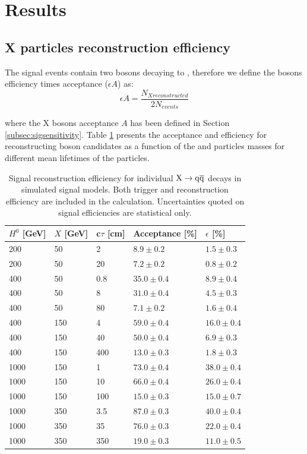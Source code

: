 \section{Results}
\label{sec:results}

\subsection{X particles reconstruction efficiency}
\label{subsec:signalefficiency}

The signal events contain two \X bosons decaying to \qq, therefore we define the \X bosons 
 efficiency times acceptance ($\epsilon A$) as:
\begin{equation}
\epsilon A= \frac{N_{X reconstructed}}{2N_{events}}
\end{equation}

where the X bosons acceptance $A$ has been defined in Section \ref{subsec:sigsensitivity}. 
Table \ref{tab:sigeff} presents the acceptance and efficiency for
reconstructing \X boson candidates as a function of the \Higgs and \X particles masses for different 
mean lifetimes of the \X particles.

\begin{table}[htbp]
\caption{Signal reconstruction efficiency for individual $\mathrm{X}\rightarrow\mathrm{q}\overline{\mathrm{q}}$ decays in simulated signal models. 
Both trigger and reconstruction efficiency 
are included in the calculation. Uncertainties quoted on signal efficiencies are statistical only.\label{tab:sigeff}}
\centering
\begin{tabular}{lllll} 
\hline
$H^{0}$ [GeV] & $X$ [GeV] & c$\tau$ [cm] & Acceptance [\%] & $\epsilon$ [\%] \\
\hline
200 & 50 & 2 & $8.9\pm0.2$ & $1.5\pm0.3$ \\
200 & 50 & 20 & $7.2\pm0.2$ & $0.8\pm0.2$ \\
\hline
400 & 50 & 0.8 & $35.0\pm0.4$ & $8.9\pm0.4$ \\
400 & 50 & 8 & $31.0\pm0.4$ & $4.5\pm0.3$ \\
400 & 50 & 80 & $7.1\pm0.2$ & $1.6\pm0.4$ \\
\hline
400 & 150 & 4 & $59.0\pm0.4$ & $16.0\pm0.4$ \\
400 & 150 & 40 & $50.0\pm0.4$ & $6.9\pm0.3$ \\
400 & 150 & 400 & $13.0\pm0.3$ & $1.8\pm0.3$ \\
\hline
1000 & 150 & 1 & $73.0\pm0.4$ & $38.0\pm0.4$ \\
1000 & 150 & 10 & $66.0\pm0.4$ & $26.0\pm0.4$ \\
1000 & 150 & 100 & $15.0\pm0.3$ & $15.0\pm0.7$ \\
\hline
1000 & 350 & 3.5 & $87.0\pm0.3$ & $40.0\pm0.4$ \\
1000 & 350 & 35 & $76.0\pm0.3$ & $22.0\pm0.4$ \\
1000 & 350 & 350 & $19.0\pm0.3$ & $11.0\pm0.5$ \\
\hline
\end{tabular} 
\end{table}

